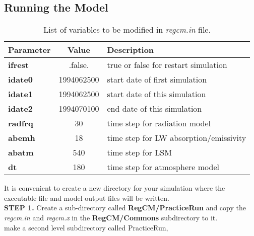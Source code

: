 \subsection{Running the Model}
\begin{table}[h]
\begin{center}
\caption{List of variables to be modified in {\it regcm.in} file.}  \label{regcm.in_file2}
\vspace{0.25cm}
\begin{tabular}{|l|c|l|} \hline \hline
{\small {\bf Parameter}} &  {\small {\bf Value}} & {\small {\bf Description}} \\ \hline \hline
{\footnotesize {\bf ifrest}} & {\footnotesize .false.} & {\footnotesize true or false for restart simulation} \\ \hline
{\footnotesize {\bf idate0}} &  {\footnotesize 1994062500} & {\footnotesize start date of first simulation} \\ \hline
{\footnotesize {\bf idate1}} &  {\footnotesize 1994062500} & {\footnotesize start date of this simulation} \\ \hline
{\footnotesize {\bf idate2}} &  {\footnotesize 1994070100} & {\footnotesize end date of this simulation} \\ \hline
{\footnotesize {\bf radfrq}} &  {\footnotesize 30} & {\footnotesize time step for radiation model} \\ \hline
{\footnotesize {\bf abemh}} &  {\footnotesize 18} & {\footnotesize time step for LW absorption/emissivity} \\ \hline
{\footnotesize {\bf abatm}} &  {\footnotesize 540} & {\footnotesize time step for LSM} \\ \hline
{\footnotesize {\bf dt}}  &  {\footnotesize 180} & {\footnotesize time step for atmosphere model} \\ \hline
\end{tabular}
\end{center}
\end{table}

\indent
It is convenient to create a new directory for your simulation where the executable file and
model output files will be written.  \\

\noindent
{\bf STEP 1.} Create a sub-directory called {\bf RegCM/PracticeRun} and copy the 
{\it regcm.in} and {\it regcm.x} in the {\bf RegCM/Commons} subdirectory to it. \\

\noindent
make a second level subdirectory called PracticeRun, \\

